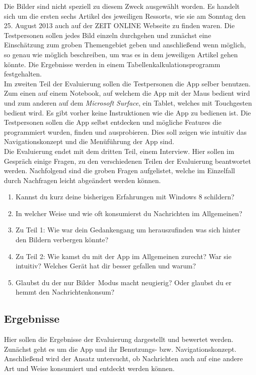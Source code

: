 \documentclass[12pt,a4paper,bibtotoc]{scrartcl}
\begin{document}
Die Bilder sind nicht speziell zu diesem Zweck ausgewählt worden. Es handelt sich um die ersten sechs Artikel des jeweiligen Ressorts, wie sie am Sonntag den 25. August 2013 auch auf der ZEIT ONLINE Webseite zu finden waren. Die Testpersonen sollen jedes Bild einzeln durchgehen und zunächst eine Einschätzung zum groben Themengebiet geben und anschließend wenn möglich, so genau wie möglich beschreiben, um was es in dem jeweiligen Artikel gehen könnte. Die Ergebnisse werden in einem Tabellenkalkulationsprogramm festgehalten.\\

Im zweiten Teil der Evaluierung sollen die Testpersonen die App selber benutzen. Zum einen auf einem Notebook, auf welchem die App mit der Maus bedient wird und zum anderen auf dem \textit{Microsoft Surface}, ein Tablet, welches mit Touchgesten bedient wird. Es gibt vorher keine Instruktionen wie die App zu bedienen ist. Die Testpersonen sollen die App selbst entdecken und mögliche Features die programmiert wurden, finden und ausprobieren. Dies soll zeigen wie intuitiv das Navigationskonzept und die Menüführung der App sind.\\

Die Evaluierung endet mit dem dritten Teil, einem Interview. Hier sollen im Gespräch einige Fragen, zu den verschiedenen Teilen der Evaluierung beantwortet werden. Nachfolgend sind die groben Fragen aufgelistet, welche im Einzelfall durch Nachfragen leicht abgeändert werden können.

\begin{enumerate}
	\item Kannst du kurz deine bisherigen Erfahrungen mit Windows 8 schildern?
	\item In welcher Weise und wie oft konsumierst du Nachrichten im Allgemeinen? 
	\item Zu Teil 1: Wie war dein Gedankengang um herauszufinden was sich hinter den Bildern verbergen könnte?
	\item Zu Teil 2: Wie kamst du mit der App im Allgemeinen zurecht? War sie intuitiv? Welches Gerät hat dir besser gefallen und warum?
	\item Glaubst du der \glqq nur Bilder\grqq\ Modus macht neugierig? Oder glaubst du er hemmt den Nachrichtenkonsum? 
\end{enumerate}




\subsection{Ergebnisse}
\label{subsec:ergebnisse}
Hier sollen die Ergebnisse der Evaluierung dargestellt und bewertet werden. Zunächst geht es um die App und ihr Benutzungs- bzw. Navigationskonzept. Anschließend wird der Ansatz untersucht, ob Nachrichten auch auf eine andere Art und Weise konsumiert und entdeckt werden können.
\end{document}
